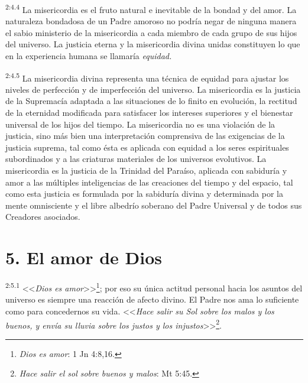 \par
\textsuperscript{2:4.4} La misericordia es el fruto natural e inevitable de la bondad y del amor. La naturaleza bondadosa de un Padre amoroso no podría negar de ninguna manera el sabio ministerio de la misericordia a cada miembro de cada grupo de sus hijos del universo. La justicia eterna y la misericordia divina unidas constituyen lo que en la experiencia humana se llamaría \textit{equidad.}

\par
\textsuperscript{2:4.5} La misericordia divina representa una técnica de equidad para ajustar los niveles de perfección y de imperfección del universo. La misericordia es la justicia de la Supremacía adaptada a las situaciones de lo finito en evolución, la rectitud de la eternidad modificada para satisfacer los intereses superiores y el bienestar universal de los hijos del tiempo. La misericordia no es una violación de la justicia, sino más bien una interpretación comprensiva de las exigencias de la justicia suprema, tal como ésta es aplicada con equidad a los seres espirituales subordinados y a las criaturas materiales de los universos evolutivos. La misericordia es la justicia de la Trinidad del Paraíso, aplicada con sabiduría y amor a las múltiples inteligencias de las creaciones del tiempo y del espacio, tal como esta justicia es formulada por la sabiduría divina y determinada por la mente omnisciente y el libre albedrío soberano del Padre Universal y de todos sus Creadores asociados.

\section*{5. El amor de Dios}
\par
\textsuperscript{2:5.1} <<\textit{Dios es amor}>>\footnote{\textit{Dios es amor}: 1 Jn 4:8,16.}; por eso su única actitud personal hacia los asuntos del universo es siempre una reacción de afecto divino. El Padre nos ama lo suficiente como para concedernos su vida. <<\textit{Hace salir su Sol sobre los malos y los buenos, y envía su lluvia sobre los justos y los injustos}>>\footnote{\textit{Hace salir el sol sobre buenos y malos}: Mt 5:45.}.


